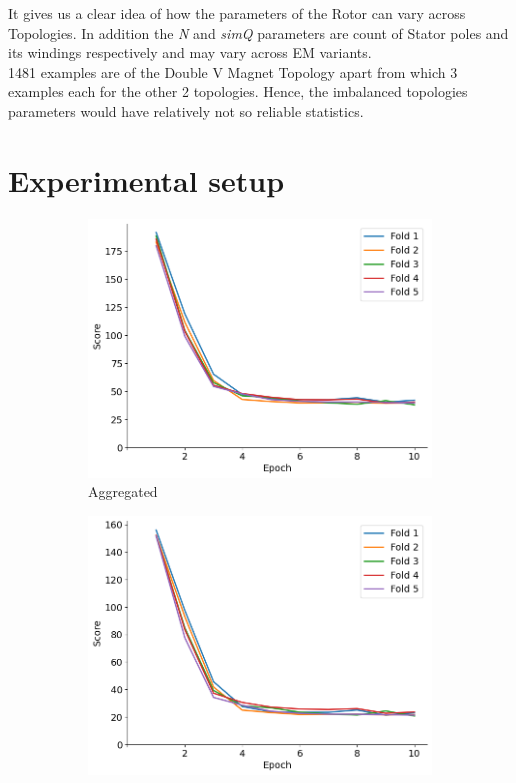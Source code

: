 \documentclass{report} %
\begin{document}
It gives us a clear idea of how the parameters of the Rotor can vary across Topologies.
In addition the \textit{N} and \textit{simQ} parameters are count of Stator poles and its windings respectively and may vary across \ac{EM} variants.\\
1481 examples are of the Double V Magnet Topology apart from which 3 examples each for the other 2 topologies.
Hence, the imbalanced topologies parameters would have relatively not so reliable statistics.\\ 

\section{Experimental setup}
\label{sec:Experimental setup}

\begin{figure}[H]
    \centering
    \begin{subfigure}{0.32\textwidth}
        \centering
        \includegraphics[width=\textwidth]{./ReportImages/train_score.png}
        \caption{\centering Aggregated }
        \label{fig:Aggregated Training Score}
    \end{subfigure}\hfill
    \begin{subfigure}{0.32\textwidth}
        \centering
        \includegraphics[width=\textwidth]{./ReportImages/train_score_y1.png}

\end{subfigure}
\end{figure}
\end{document}
